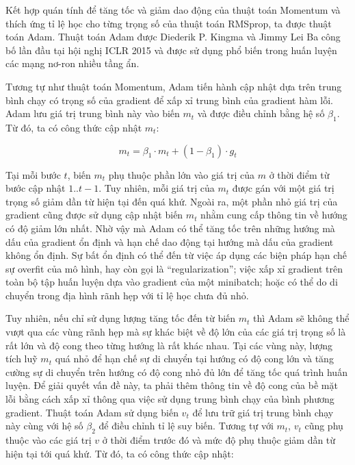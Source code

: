 Kết hợp quán tính để tăng tốc và giảm dao động của thuật toán Momentum và thích ứng tỉ lệ học cho từng trọng số của thuật toán RMSprop, ta được thuật toán Adam. Thuật toán Adam \cite{kingma2014adam} được Diederik P. Kingma và Jimmy Lei Ba công bố lần đầu tại hội nghị ICLR 2015 và được sử dụng phổ biến trong huấn luyện các mạng nơ-ron nhiều tầng ẩn.

Tương tự như thuật toán Momentum, Adam tiến hành cập nhật dựa trên trung bình chạy có trọng số của gradient để xấp xỉ trung bình của gradient hàm lỗi. Adam lưu giá trị trung bình này vào biến $m_t$ và được điều chỉnh bằng hệ số $\beta_1$. Từ đó, ta có công thức cập nhật $m_t$:

\begin{equation} \label{eqn:adam-m}
	m_t = \beta_1 \cdot m_t + (1 - \beta_1) \cdot g_t
\end{equation}

Tại mỗi bước $t$, biến $m_t$ phụ thuộc phần lớn vào giá trị của $m$ ở thời điểm từ bước cập nhật $1..t-1$. Tuy nhiên, mỗi giá trị của $m_t$ được gán với một giá trị trọng số giảm dần từ hiện tại đến quá khứ. Ngoài ra, một phần nhỏ giá trị của gradient cũng được sử dụng cập nhật biến $m_t$ nhằm cung cấp thông tin về hướng có độ giảm lớn nhất. Nhờ vậy mà Adam có thể tăng tốc trên những hướng mà dấu của gradient ổn định và hạn chế dao động tại hướng mà dấu của gradient không ổn định. Sự bất ổn định có thể đến từ việc áp dụng các biện pháp hạn chế sự overfit của mô hình, hay còn gọi là ``regularization''; việc xấp xỉ gradient trên toàn bộ tập huấn luyện dựa vào gradient của một minibatch; hoặc có thể do di chuyển trong địa hình rãnh hẹp với tỉ lệ học chưa đủ nhỏ.

Tuy nhiên, nếu chỉ sử dụng lượng tăng tốc đến từ biến $m_t$ thì Adam sẽ không thể vượt qua các vùng rãnh hẹp mà sự khác biệt về độ lớn của các giá trị trọng số là rất lớn và độ cong theo từng hướng là rất khác nhau. Tại các vùng này, lượng tích luỹ $m_t$ quá nhỏ để hạn chế sự di chuyển tại hướng có độ cong lớn và tăng cường sự di chuyển trên hướng có độ cong nhỏ đủ lớn để tăng tốc quá trình huấn luyện. Để giải quyết vấn đề này, ta phải thêm thông tin về độ cong của bề mặt lỗi bằng cách xấp xỉ thông qua việc sử dụng trung bình chạy của bình phương gradient. Thuật toán Adam sử dụng biến $v_t$ để lưu trữ giá trị trung bình chạy này cùng với hệ số $\beta_2$ để điều chỉnh tỉ lệ suy biến. Tương tự với $m_t$, $v_t$ cũng phụ thuộc vào các giá trị $v$ ở thời điểm trước đó và mức độ phụ thuộc giảm dần từ hiện tại tới quá khứ. Từ đó, ta có công thức cập nhật:

